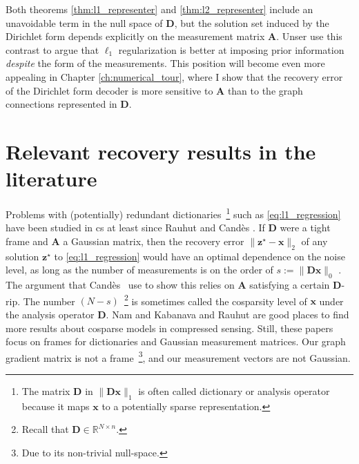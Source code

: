 Both theorems \ref{thm:l1_representer} and \ref{thm:l2_representer} include an unavoidable term in the null space of $\mathbf{D}$, but the solution set induced by the Dirichlet form depends explicitly on the measurement matrix $\mathbf{A}$. Unser \etal \cite{unser2016} use this contrast to argue that $\ell_1$ regularization is better at imposing prior information \emph{despite} the form of the measurements. This position will become even more appealing in Chapter \ref{ch:numerical_tour}, where I show that the recovery error of the Dirichlet form decoder is more sensitive to $\mathbf{A}$ than to the graph connections represented in $\mathbf{D}$.

\section{Relevant recovery results in the literature}

Problems with (potentially) redundant dictionaries~\footnote{The matrix $\mathbf{D}$ in $\|\mathbf{Dx}\|_1$ is often called dictionary or analysis operator because it maps $\mathbf{x}$ to a potentially sparse representation.} such as \eqref{eq:l1_regression} have been studied in \acrlong{cs} at least since Rauhut \etal \cite{rauhut2008} and Cand\`es \etal \cite{candes2011}. If $\mathbf{D}$ were a tight frame and $\mathbf{A}$ a Gaussian matrix, then the recovery error $\|\mathbf{z}^\star - \mathbf{x}\|_2$ of any solution $\mathbf{z}^\star$ to \eqref{eq:l1_regression} would have an optimal dependence on the noise level, as long as the number of measurements is on the order of $s := \|\mathbf{Dx}\|_0$ \cite[Theorem 1.2]{candes2011}. The argument that Cand\`es \etal \, use to show this relies on $\mathbf{A}$ satisfying a certain $\mathbf{D}$-\acrlong{rip}. The number $(N - s)$~\footnote{Recall that $\mathbf{D} \in \mathbb{R}^{N \times n}$.} is sometimes called the cosparsity level of $\mathbf{x}$ under the analysis operator $\mathbf{D}$. Nam \etal \cite{nam2013} and Kabanava and Rauhut \cite{kabanava2015} are good places to find more results about cosparse models in compressed sensing. Still, these papers focus on frames for dictionaries and Gaussian measurement matrices. Our graph gradient matrix is not a frame~\footnote{Due to its non-trivial null-space.}, and our measurement vectors are not Gaussian.

